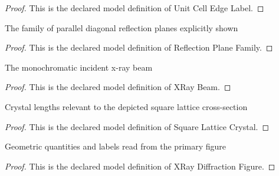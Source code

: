 \begin{proof}
  This is the declared model definition of Unit Cell Edge Label.
\end{proof}
\begin{definition}
  \label{def:physics:phyx-mini-0080:phyxminiproblems-problemphyxmini0080-reflectionplanefamily}
  The family of parallel diagonal reflection planes explicitly shown
\end{definition}
\begin{proof}
  This is the declared model definition of Reflection Plane Family.
\end{proof}
\begin{definition}
  \label{def:physics:phyx-mini-0080:phyxminiproblems-problemphyxmini0080-xraybeam}
  The monochromatic incident x-ray beam
\end{definition}
\begin{proof}
  This is the declared model definition of XRay Beam.
\end{proof}
\begin{definition}
  \label{def:physics:phyx-mini-0080:phyxminiproblems-problemphyxmini0080-squarelatticecrystal}
  Crystal lengths relevant to the depicted square lattice cross-section
\end{definition}
\begin{proof}
  This is the declared model definition of Square Lattice Crystal.
\end{proof}
\begin{definition}
  \label{def:physics:phyx-mini-0080:phyxminiproblems-problemphyxmini0080-xraydiffractionfigure}
  Geometric quantities and labels read from the primary figure
\end{definition}
\begin{proof}
  This is the declared model definition of XRay Diffraction Figure.
\end{proof}
